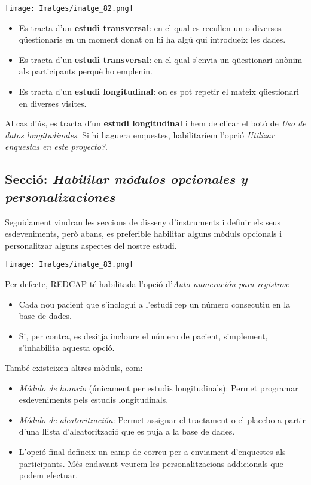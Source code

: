 \documentclass[
]{article}
\providecommand{\tightlist}{%
  \setlength{\itemsep}{0pt}\setlength{\parskip}{0pt}}
\begin{document}
\texttt{[image: Imatges/imatge\_82.png]}

\begin{itemize}
\tightlist
\item
  Es tracta d'un \textbf{estudi transversal}: en el qual es recullen un o diversos qüestionaris en un moment donat on hi ha algú qui introdueix les dades.
\item
  Es tracta d'un \textbf{estudi transversal}: en el qual s'envia un qüestionari anònim als participants perquè ho emplenin.
\item
  Es tracta d'un \textbf{estudi longitudinal}: on es pot repetir el mateix qüestionari en diverses visites.
\end{itemize}

Al cas d'ús, es tracta d'un \textbf{estudi longitudinal} i hem de clicar el botó de \emph{Uso de datos longitudinales}. Si hi haguera enquestes, habilitaríem l'opció \emph{Utilizar enquestas en este proyecto?}.

\hypertarget{secciuxf3-habilitar-muxf3dulos-opcionales-y-personalizaciones}{%
\subsection{\texorpdfstring{\textbf{Secció:} \emph{Habilitar módulos opcionales y personalizaciones}}{Secció: Habilitar módulos opcionales y personalizaciones}}\label{secciuxf3-habilitar-muxf3dulos-opcionales-y-personalizaciones}}

Seguidament vindran les seccions de disseny d'instruments i definir els seus esdeveniments, però abans, es preferible habilitar alguns mòduls opcionals i personalitzar alguns aspectes del nostre estudi.

\texttt{[image: Imatges/imatge\_83.png]}

Per defecte, REDCAP té habilitada l'opció d'\emph{Auto-numeración para registros}:

\begin{itemize}
\tightlist
\item
  Cada nou pacient que s'inclogui a l'estudi rep un número consecutiu en la base de dades.
\item
  Si, per contra, es desitja incloure el número de pacient, simplement, s'inhabilita aquesta opció.
\end{itemize}

També existeixen altres mòduls, com:

\begin{itemize}
\tightlist
\item
  \emph{Módulo de horario} (únicament per estudis longitudinals): Permet programar esdeveniments pels estudis longitudinals.
\item
  \emph{Módulo de aleatoritzación}: Permet assignar el tractament o el placebo a partir d'una llista d'aleatorització que es puja a la base de dades.
\item
  L'opció final defineix un camp de correu per a enviament d'enquestes als participants. Més endavant veurem les personalitzacions addicionals que podem efectuar.
\end{itemize}
\end{document}
